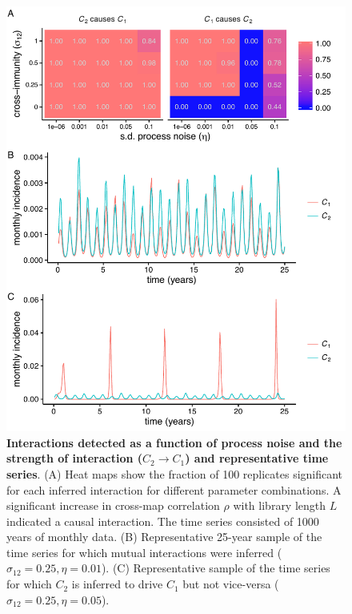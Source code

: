 \begin{figure}
\begin{center}
  \includegraphics[width=6in]{dataflow/out/fig_detect_increase/fig_detect_increase.pdf}
  \end{center}
  \caption{\textbf{Interactions detected as a function of process noise and the strength of interaction ($C_2 \rightarrow C_1$) and representative time series}. (A) Heat maps show the fraction of 100 replicates significant for each inferred interaction for different parameter combinations. A significant increase in cross-map correlation $\rho$ with library length $L$ indicated a causal interaction. The time series consisted of 1000 years of monthly data. (B) Representative 25-year sample of the time series for which mutual interactions were inferred ($\sigma_{12}=0.25, \eta=0.01$). (C) Representative sample of the time series for which $C_2$ is inferred to drive $C_1$ but not vice-versa ($\sigma_{12}=0.25, \eta=0.05$).  \label{fig:univar_monthly_hm_tmp}} 
\end{figure}

